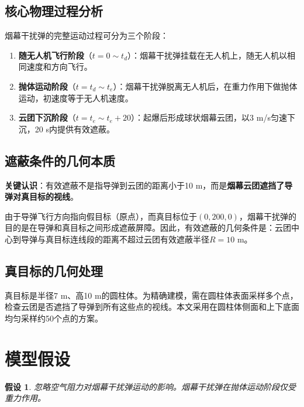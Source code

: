 \documentclass[12pt,a4paper]{article}
\newtheorem{assumption}{假设}
\begin{document}
\subsection{核心物理过程分析}

烟幕干扰弹的完整运动过程可分为三个阶段：

\begin{enumerate}[label=(\arabic*)]
    \item \textbf{随无人机飞行阶段}（$t = 0 \sim t_d$）：烟幕干扰弹挂载在无人机上，随无人机以相同速度和方向飞行。
    \item \textbf{抛体运动阶段}（$t = t_d \sim t_e$）：烟幕干扰弹脱离无人机后，在重力作用下做抛体运动，初速度等于无人机速度。
    \item \textbf{云团下沉阶段}（$t = t_e \sim t_e + 20$）：起爆后形成球状烟幕云团，以3 m/s匀速下沉，20 s内提供有效遮蔽。
\end{enumerate}

\subsection{遮蔽条件的几何本质}

\textbf{关键认识}：有效遮蔽不是指导弹到云团的距离小于10 m，而是\textbf{烟幕云团遮挡了导弹对真目标的视线}。

由于导弹飞行方向指向假目标（原点），而真目标位于$(0, 200, 0)$，烟幕干扰弹的目的是在导弹和真目标之间形成遮蔽屏障。因此，有效遮蔽的几何条件是：云团中心到导弹与真目标连线段的距离不超过云团有效遮蔽半径$R = 10$ m。

\subsection{真目标的几何处理}

真目标是半径7 m、高10 m的圆柱体。为精确建模，需在圆柱体表面采样多个点，检查云团是否遮挡了导弹到所有这些点的视线。本文采用在圆柱体侧面和上下底面均匀采样约50个点的方案。


\section{模型假设}

\begin{assumption}
忽略空气阻力对烟幕干扰弹运动的影响。烟幕干扰弹在抛体运动阶段仅受重力作用。
\end{assumption}
\end{document}
